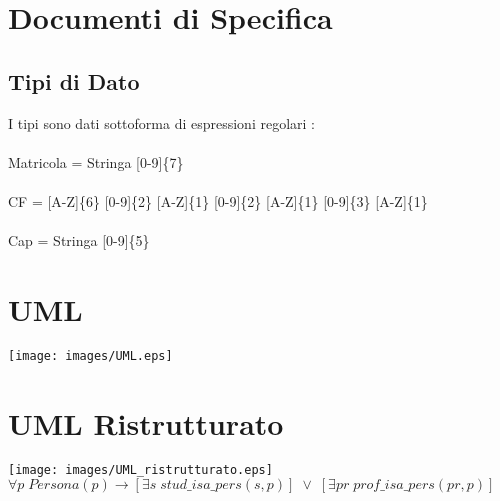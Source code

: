 \documentclass[12pt, letterpaper]{article}
\newcommand{\acc}{\\\hphantom{}\\}
\begin{document}
\section{Documenti di Specifica}
\subsection{Tipi di Dato}
I tipi sono dati sottoforma di espressioni regolari : \acc
Matricola = Stringa [0-9]\{7\}\acc 
CF = [A-Z]\{6\} [0-9]\{2\} [A-Z]\{1\} [0-9]\{2\} [A-Z]\{1\} [0-9]\{3\} [A-Z]\{1\}\acc 
Cap = Stringa [0-9]\{5\} 

\newpage
\section{UML}\begin{center}
    \texttt{[image: images/UML.eps]}
\end{center}

\newpage
\section{UML Ristrutturato}\begin{center}
    \texttt{[image: images/UML\_ristrutturato.eps]}
    $\forall p\;Persona(p)\rightarrow [\exists s\;stud\_isa\_pers(s,p)]
    \;\lor\;[\exists pr\;prof\_isa\_pers(pr,p)]$
\end{center}
\end{document}
